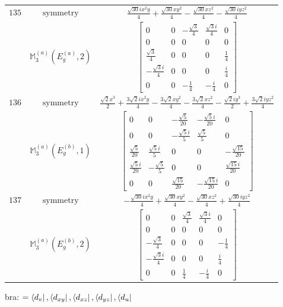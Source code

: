 \documentclass[fleqn,8pt,landscape]{jsarticle}
\begin{document}
\begin{longtable}{ccc}
$ 135 $ & $ \text{symmetry} $ & $ \frac{\sqrt{30} i x^{2} y}{4} + \frac{\sqrt{30} x y^{2}}{4} - \frac{\sqrt{30} x z^{2}}{4} - \frac{\sqrt{30} i y z^{2}}{4} $ \\
$  $ & $ \mathbb{M}_{3}^{(a)}(E_{g}^{(a)},2) $ & $ \begin{bmatrix} 0 & 0 & - \frac{\sqrt{3}}{4} & \frac{\sqrt{3} i}{4} & 0 \\ 0 & 0 & 0 & 0 & 0 \\ \frac{\sqrt{3}}{4} & 0 & 0 & 0 & \frac{1}{4} \\ - \frac{\sqrt{3} i}{4} & 0 & 0 & 0 & \frac{i}{4} \\ 0 & 0 & - \frac{1}{4} & - \frac{i}{4} & 0 \end{bmatrix} $ \\ \hline
$ 136 $ & $ \text{symmetry} $ & $ \frac{\sqrt{2} x^{3}}{2} + \frac{3 \sqrt{2} i x^{2} y}{4} - \frac{3 \sqrt{2} x y^{2}}{4} - \frac{3 \sqrt{2} x z^{2}}{4} - \frac{\sqrt{2} i y^{3}}{2} + \frac{3 \sqrt{2} i y z^{2}}{4} $ \\
$  $ & $ \mathbb{M}_{3}^{(a)}(E_{g}^{(b)},1) $ & $ \begin{bmatrix} 0 & 0 & - \frac{\sqrt{5}}{20} & - \frac{\sqrt{5} i}{20} & 0 \\ 0 & 0 & - \frac{\sqrt{5} i}{5} & \frac{\sqrt{5}}{5} & 0 \\ \frac{\sqrt{5}}{20} & \frac{\sqrt{5} i}{5} & 0 & 0 & - \frac{\sqrt{15}}{20} \\ \frac{\sqrt{5} i}{20} & - \frac{\sqrt{5}}{5} & 0 & 0 & \frac{\sqrt{15} i}{20} \\ 0 & 0 & \frac{\sqrt{15}}{20} & - \frac{\sqrt{15} i}{20} & 0 \end{bmatrix} $ \\ \hline
$ 137 $ & $ \text{symmetry} $ & $ - \frac{\sqrt{30} i x^{2} y}{4} + \frac{\sqrt{30} x y^{2}}{4} - \frac{\sqrt{30} x z^{2}}{4} + \frac{\sqrt{30} i y z^{2}}{4} $ \\
$  $ & $ \mathbb{M}_{3}^{(a)}(E_{g}^{(b)},2) $ & $ \begin{bmatrix} 0 & 0 & \frac{\sqrt{3}}{4} & \frac{\sqrt{3} i}{4} & 0 \\ 0 & 0 & 0 & 0 & 0 \\ - \frac{\sqrt{3}}{4} & 0 & 0 & 0 & - \frac{1}{4} \\ - \frac{\sqrt{3} i}{4} & 0 & 0 & 0 & \frac{i}{4} \\ 0 & 0 & \frac{1}{4} & - \frac{i}{4} & 0 \end{bmatrix} $ \\ \hline
\end{longtable}
bra: $=\bra{d_{v}}, \bra{d_{xy}}, \bra{d_{xz}}, \bra{d_{yz}}, \bra{d_{u}}$
\end{document}
